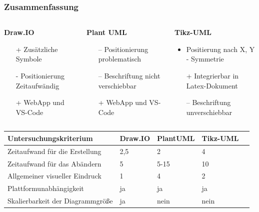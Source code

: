 \documentclass[xcolor=dvipsnames]{beamer}
\begin{document}
\begin{frame}
	\frametitle{Zusammenfassung}
	\begin{columns}
	
			
			\begin{column}{0.33\textwidth}
				\begin{block}{\textbf{Draw.IO}}
					\begin{itemize}
						\item [+] Zusätzliche Symbole
						\item [-] Positionierung Zeitaufwändig
						\item[+] WebApp und VS-Code
					\end{itemize}
				\end{block}
			\end{column}

		\begin{column}{0.4\textwidth}
			\begin{block}{\textbf{Plant UML}}
				\begin{itemize}
					\item[--] Positionierung problematisch
					\item[--] Beschriftung nicht verschiebbar
					\item[+] WebApp und VS-Code
				\end{itemize}
			\end{block}
		\end{column}
		
		\begin{column}{0.33\textwidth}
			\begin{block}{\textbf{Tikz-UML}}
				\begin{itemize}
					\item Positierung nach X, Y - Symmetrie
					\item[+] Integrierbar in Latex-Dokument 
					\item[--] Beschriftung unverschiebbar
				\end{itemize}
			\end{block}
		\end{column}
		
	\end{columns}
	\begin{table}
		\begin{tabular}{l l l l l}
			\toprule
			\textbf{Untersuchungskriterium} & \textbf{Draw.IO} & \textbf{PlantUML} & \textbf{Tikz-UML}\\
			\midrule
			Zeitaufwand für die Erstellung & 2,5 & 2 & 4 \\
			\midrule
			Zeitaufwand für das Abändern & 5 & 5-15 & 10  \\
			\midrule
			Allgemeiner visueller Eindruck & 1 & 4 & 2 \\
			\midrule
			Plattformunabhängigkeit & ja & ja & ja\\
			\midrule
			Skalierbarkeit der Diagrammgröße & ja & nein & nein\\
			\bottomrule
		\end{tabular}
	\end{table}
	

\end{frame}
\end{document}
